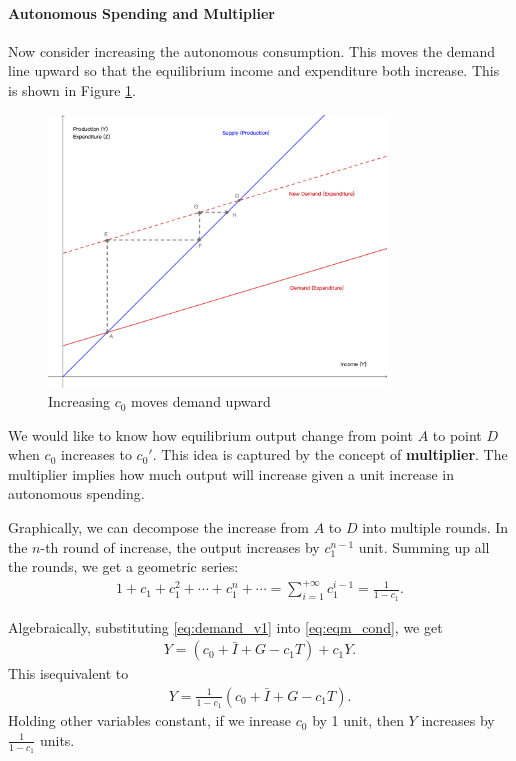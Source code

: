 \documentclass[12pt]{article}
\begin{document}
\paragraph{Autonomous Spending and Multiplier}
Now consider increasing the autonomous consumption. This moves the demand line upward so that the equilibrium income and expenditure both increase. This is shown in Figure \ref{fig:key_cross_v2}.

\begin{figure}[htp]
    \centering
    \includegraphics[width=0.8\textwidth]{keynesian_cross_c0change.png}
    \caption{Increasing $c_0$ moves demand upward}
    \label{fig:key_cross_v2}
\end{figure}

We would like to know how equilibrium output change from point $A$ to point $D$ when $c_0$ increases to $c_0'$. This idea is captured by the concept of \textbf{multiplier}. The multiplier implies how much output will increase given a unit increase in autonomous spending. 

Graphically, we can decompose the increase from $A$ to $D$ into multiple rounds. In the $n$-th round of increase, the output increases by $c_1^{n-1}$ unit. Summing up all the rounds, we get a geometric series:
\begin{align*}
    1 + c_1 + c_1^2 + \cdots + c_1^n + \cdots = \sum_{i=1}^{+\infty} c_1^{i-1} = \frac{1}{1-c_1}.
\end{align*}

Algebraically, substituting \eqref{eq:demand_v1} into \eqref{eq:eqm_cond}, we get
\begin{align*}
    Y = (c_0 + \bar{I} + G - c_1T) + c_1Y.
\end{align*}
This isequivalent to
\begin{align*}
    Y = \frac{1}{1-c_1} (c_0 + \bar{I} + G - c_1T).
\end{align*}
Holding other variables constant, if we inrease $c_0$ by 1 unit, then $Y$ increases by $\frac{1}{1-c_1}$ units.
\end{document}
